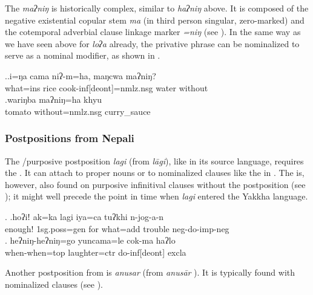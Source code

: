 The \emph{maʔniŋ} is historically complex, similar to \emph{haʔniŋ} above. It is composed of the negative existential copular stem \emph{ma} (in third person singular, zero-marked) and  the cotemporal adverbial clause linkage marker \emph{=niŋ} (see \Next). In the same way as we have seen above for \emph{loʔa} already, the privative phrase can be nominalized to serve as a nominal modifier, as shown in \Next[b].
  
  \ex.\ag.i=ŋa      cama        niʔ-m=ha,     maŋcwa maʔniŋ?\\
  what{\sc =ins} rice cook{\sc -inf[deont]=nmlz.nsg} water without\\
 
\bg.wariŋba maʔniŋ=ha khyu\\
tomato without{\sc =nmlz.nsg} curry\_sauce\\
  
  
\subsubsection{Postpositions from Nepali}
  
The /purposive postposition \emph{lagi} (from   \emph{lāgi}), like in its source language, requires the  . It can attach to proper nouns  or to nominalized clauses like the  in \Next[b]. The  is, however, also found on purposive infinitival clauses without the postposition (see ); it might well precede the point in time when \emph{lagi} entered the Yakkha language.

\ex. \ag.hoʔiǃ  ak=ka          lagi  iya=ca                       tuʔkhi n-jog-a-n\\
enough! {\sc 1sg.poss=gen} for what{\sc =add} trouble {\sc neg-}do{\sc -imp-neg}\\
 
 \bg.  heʔniŋ-heʔniŋ=go    yuncama=le           cok-ma       haʔlo\\
when-when{\sc =top} laughter{\sc =ctr} do{\sc -inf[deont]} {\sc excla}\\
 

Another postposition from  is \emph{anusar}  (from  \emph{anusār} ). It is typically found with nominalized clauses (see \Next).


